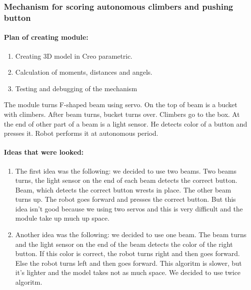 \subsubsection{Mechanism for scoring autonomous climbers and pushing button}
\paragraph{Plan of creating module:}	
	
	\begin{enumerate}
		\item Creating 3D model in Creo parametric.
		\item Calculation of moments, distances and angels.
		\item Testing and debugging of the mechanism
	\end{enumerate}
	
	The module turns F-shaped beam using servo. On the top of beam is a bucket with climbers. After beam turns, bucket turns over. Climbers go to the box. At the end of other part of a beam is a light sensor. He detects color of a button and presses it. Robot performs it at autonomous period. \newline
	
	\paragraph{Ideas that were looked:}
	
	\begin{enumerate}	
		\item The first idea was the following: we decided to use two beams. Two beams turns, the light sensor on the end of each beam detects the correct button. Beam, which detects the correct button wrests in place. The other beam turns up. The robot goes forward and presses the correct button. But this idea isn't good because we using two servos and this is very difficult and the module take up much up space.
	
		\item Another idea was the following: we decided to use one beam. The beam turns and the light sensor on the end of the beam detects the color of the right button. If this color is correct, the robot turns right and then goes forward. Else the robot turns left and then goes forward. This algoritm is slower, but it's lighter and the model takes not as much space. We decided to use twice algoritm.
	\end{enumerate}
	

